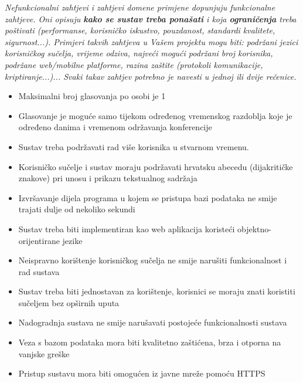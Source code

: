 			 \textit{Nefunkcionalni zahtjevi i zahtjevi domene primjene dopunjuju funkcionalne zahtjeve. Oni opisuju \textbf{kako se sustav treba ponašati} i koja \textbf{ograničenja} treba poštivati (performanse, korisničko iskustvo, pouzdanost, standardi kvalitete, sigurnost...). Primjeri takvih zahtjeva u Vašem projektu mogu biti: podržani jezici korisničkog sučelja, vrijeme odziva, najveći mogući podržani broj korisnika, podržane web/mobilne platforme, razina zaštite (protokoli komunikacije, kriptiranje...)... Svaki takav zahtjev potrebno je navesti u jednoj ili dvije rečenice.}
			 \begin{itemize}
			 	\item Maksimalni broj glasovanja po osobi je 1
			 	\item Glasovanje je moguće samo tijekom određenog vremenskog razdoblja koje je određeno danima i vremenom održavanja konferencije
			 	\item Sustav treba podržavati rad više korisnika u stvarnom vremenu.
			 	\item Korisničko sučelje i sustav moraju podržavati hrvatsku abecedu (dijakritičke
			 	znakove) pri unosu i prikazu tekstualnog sadržaja
			 	\item Izvršavanje dijela programa u kojem se pristupa bazi podataka ne smije trajati dulje od nekoliko sekundi
			 	\item Sustav treba biti implementiran kao web aplikacija koristeći objektno-orijentirane
			 	jezike
			 	\item Neispravno korištenje korisničkog sučelja ne smije narušiti funkcionalnost i
			 	rad sustava
			 	\item Sustav treba biti jednostavan za korištenje, korisnici se moraju znati koristiti
			 	sučeljem bez opširnih uputa
			 	\item Nadogradnja sustava ne smije narušavati postojeće funkcionalnosti sustava
			 	\item Veza s bazom podataka mora biti kvalitetno zaštićena, brza i otporna na vanjske greške
			 	\item Pristup sustavu mora biti omogućen iz javne mreže pomoću HTTPS
			 \end{itemize}
			 
			 
			 
	